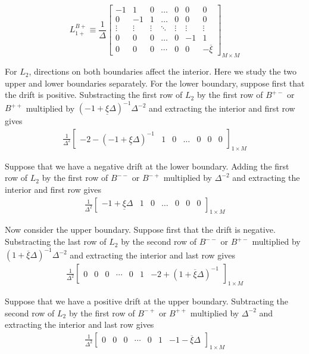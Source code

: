 \documentclass[11pt]{article}
\theoremstyle{definition}
\begin{document}
\begin{equation}
L_{1+}^{B+} \equiv \frac{1}{\Delta}\begin{bmatrix}
-1 &1&0&\dots&0&0&0\\
0&-1&1&\dots&0&0&0\\
\vdots&\vdots&\vdots&\ddots&\vdots&\vdots&\vdots\\
0&0&0&\dots&0&-1&1\\
0&0&0&\cdots&0&0&-\overline{\xi} 
\end{bmatrix}_{M\times M} \label{eq:L-1p-regular-right}
\end{equation}

For $L_2$, directions on both boundaries affect the interior. Here we study the two upper and lower boundaries separately. For the lower boundary, suppose first that the drift is positive. Substracting the first row of $L_2$ by the first row of $B^{+-}$ or $B^{++}$ multiplied by $(-1 + \underline{\xi} \Delta )^{-1} \Delta^{-2}$ and extracting the interior and first row gives
\begin{align}
\frac{1}{\Delta^2}\begin{bmatrix}
-2 - (-1 + \underline{\xi}\Delta)^{-1} &1&0&\dots&0&0&0
\end{bmatrix}_{1\times M}
\end{align}

Suppose that we have a negative drift at the lower boundary. Adding the first row of $L_2$ by the first row of $B^{--}$ or $B^{-+}$ multiplied by $\Delta^{-2}$ and extracting the interior and first row gives
\begin{align}
\frac{1}{\Delta^2}\begin{bmatrix}
-1 + \underline{\xi}\Delta &1&0&\dots&0&0&0
\end{bmatrix}_{1\times M}
\end{align}

Now consider the upper boundary. Suppose first that the drift is negative. Substracting the last row of $L_2$ by the second row of $B^{--}$ or $B^{+-}$ multiplied by $(1 + \overline{\xi} \Delta)^{-1} \Delta^{-2}$ and extracting the interior and last row gives 
\begin{align}
\frac{1}{\Delta^2}\begin{bmatrix}
0&0&0&\cdots&0&1&-2 +(1+ \overline{\xi}\Delta)^{-1}
\end{bmatrix}_{1\times M}
\end{align}

Suppose that we have a positive drift at the upper boundary. Subtracting the second row of $L_2$ by the first row of $B^{-+}$ or $B^{++}$ multiplied by $\Delta^{-2}$ and extracting the interior and last row gives
\begin{align}
\frac{1}{\Delta^2}\begin{bmatrix}
0&0&0&\cdots&0&1&-1 - \overline{\xi}\Delta
\end{bmatrix}_{1\times M}
\end{align}
\end{document}
